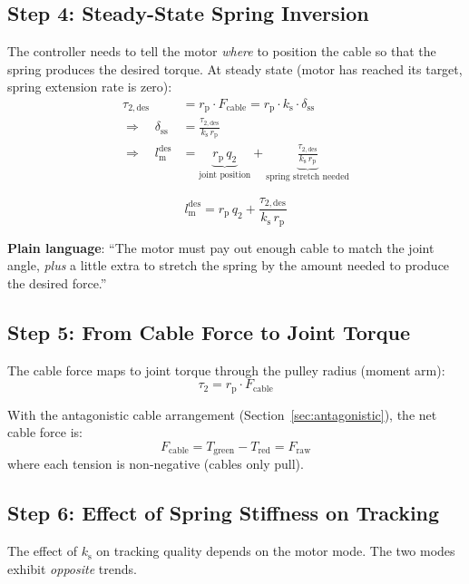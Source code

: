 \documentclass[11pt,a4paper]{article}
\newcommand{\rp}{r_{\mathrm{p}}}
\newcommand{\lm}{l_{\mathrm{m}}}
\newcommand{\ks}{k_{\mathrm{s}}}
\begin{document}
\subsection{Step 4: Steady-State Spring Inversion}

The controller needs to tell the motor \emph{where} to position the cable so that the spring produces the desired torque.  At steady state (motor has reached its target, spring extension rate is zero):
\begin{align}
    \tau_{2,\mathrm{des}} &= \rp \cdot F_{\mathrm{cable}} = \rp \cdot \ks \cdot \delta_{\mathrm{ss}} \\
    \Rightarrow\quad \delta_{\mathrm{ss}} &= \frac{\tau_{2,\mathrm{des}}}{\ks \, \rp} \\
    \Rightarrow\quad \lm^{\mathrm{des}} &= \underbrace{\rp \, q_2}_{\text{joint position}} + \underbrace{\frac{\tau_{2,\mathrm{des}}}{\ks \, \rp}}_{\text{spring stretch needed}}
\end{align}

\begin{equation}
\boxed{\lm^{\mathrm{des}} = \rp \, q_2 + \frac{\tau_{2,\mathrm{des}}}{\ks \, \rp}}
\end{equation}

\textbf{Plain language}: ``The motor must pay out enough cable to match the joint angle, \emph{plus} a little extra to stretch the spring by the amount needed to produce the desired force.''


\subsection{Step 5: From Cable Force to Joint Torque}

The cable force maps to joint torque through the pulley radius (moment arm):
\begin{equation}
\boxed{\tau_2 = \rp \cdot F_{\mathrm{cable}}}
\end{equation}

With the antagonistic cable arrangement (Section~\ref{sec:antagonistic}), the net cable force is:
\[
    F_{\mathrm{cable}} = T_{\mathrm{green}} - T_{\mathrm{red}} = F_{\mathrm{raw}}
\]
where each tension is non-negative (cables only pull).


\subsection{Step 6: Effect of Spring Stiffness on Tracking}

The effect of $\ks$ on tracking quality depends on the motor mode.  The two modes exhibit \emph{opposite} trends.
\end{document}
